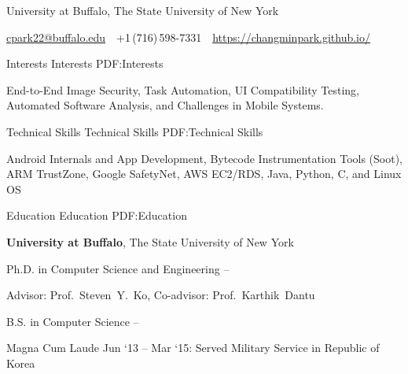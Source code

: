 \documentclass[letterpaper,MMMyyyy,nonstopmode]{simpleresumecv}
\newcommand{\CVAuthor}{Chang Min Park}
\newcommand{\CVWebpage}{https://changminpark.github.io/}
\begin{document}

\Title{\CVAuthor}

\begin{SubTitle}
University at Buffalo, The State University of New York
\par
\href{mailto:cpark22@buffalo.edu}
{cpark22@buffalo.edu}
\,\SubBulletSymbol\,
+1\,(716)\,598-7331
\,\SubBulletSymbol\,
\href{\CVWebpage}
{\url{\CVWebpage}}
\end{SubTitle}

\begin{Body}

\vspace{-0.7ex}
\Section
{Interests}
{Interests}
{PDF:Interests}

\Entry
End-to-End Image Security, Task Automation, UI Compatibility Testing, 
Automated Software Analysis, and Challenges in Mobile Systems.

\vspace{-0.7ex}
\Section
{Technical Skills}
{Technical Skills}
{PDF:Technical Skills}

\Entry
Android Internals and App Development, Bytecode Instrumentation Tools (Soot),
ARM TrustZone, Google SafetyNet, AWS EC2/RDS, Java, Python, C, and Linux OS

\vspace{-0.7ex}
\Section
{Education}
{Education}
{PDF:Education}

\Entry
\textbf{University at Buffalo}, The State University of New York

\Gap
\BulletItem
Ph.D. in Computer Science and Engineering
\hfill
{} --
\begin{Detail}
\SubBulletItem
Advisor:
Prof.~Steven~Y.~Ko, 
Co-advisor:
Prof.~Karthik~Dantu
\end{Detail}

\Gap
\BulletItem
B.S. in Computer Science
\hfill
{} --
\begin{Detail}
\SubBulletItem
Magna Cum Laude
\SubBulletItem
Jun `13 -- Mar `15: Served Military Service in Republic of Korea
\end{Detail}




\end{Body}
\end{document}
